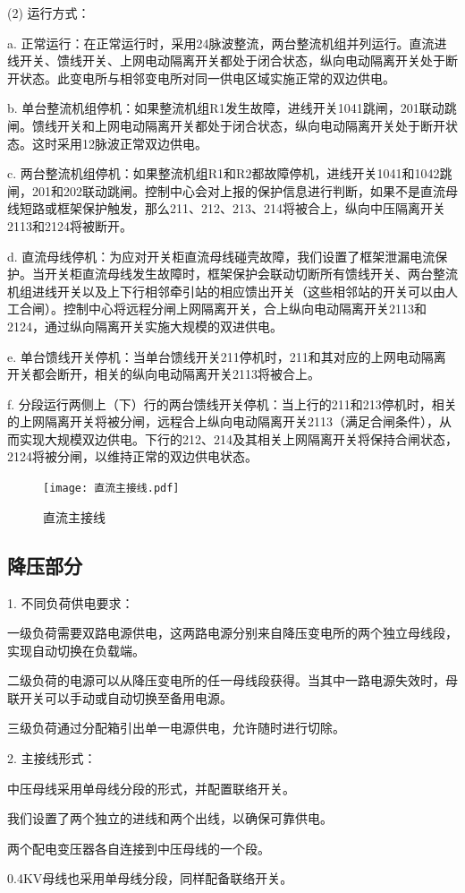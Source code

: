 (2) 运行方式：\par 
a. 正常运行：在正常运行时，采用24脉波整流，两台整流机组并列运行。直流进线开关、馈线开关、上网电动隔离开关都处于闭合状态，纵向电动隔离开关处于断开状态。此变电所与相邻变电所对同一供电区域实施正常的双边供电。\par 
b. 单台整流机组停机：如果整流机组R1发生故障，进线开关1041跳闸，201联动跳闸。馈线开关和上网电动隔离开关都处于闭合状态，纵向电动隔离开关处于断开状态。这时采用12脉波正常双边供电。\par 
c. 两台整流机组停机：如果整流机组R1和R2都故障停机，进线开关1041和1042跳闸，201和202联动跳闸。控制中心会对上报的保护信息进行判断，如果不是直流母线短路或框架保护触发，那么211、212、213、214将被合上，纵向中压隔离开关2113和2124将被断开。\par 
d. 直流母线停机：为应对开关柜直流母线碰壳故障，我们设置了框架泄漏电流保护。当开关柜直流母线发生故障时，框架保护会联动切断所有馈线开关、两台整流机组进线开关以及上下行相邻牵引站的相应馈出开关（这些相邻站的开关可以由人工合闸）。控制中心将远程分闸上网隔离开关，合上纵向电动隔离开关2113和2124，通过纵向隔离开关实施大规模的双进供电。\par 
e. 单台馈线开关停机：当单台馈线开关211停机时，211和其对应的上网电动隔离开关都会断开，相关的纵向电动隔离开关2113将被合上。\par 
f. 分段运行两侧上（下）行的两台馈线开关停机：当上行的211和213停机时，相关的上网隔离开关将被分闸，远程合上纵向电动隔离开关2113（满足合闸条件），从而实现大规模双边供电。下行的212、214及其相关上网隔离开关将保持合闸状态，2124将被分闸，以维持正常的双边供电状态。
\begin{figure}[!h]
	\centering
	\texttt{[image: 直流主接线.pdf]}
	\caption{直流主接线}
	\label{直流主接线}
\end{figure}
\subsection{降压部分}
1. 不同负荷供电要求：\par 

一级负荷需要双路电源供电，这两路电源分别来自降压变电所的两个独立母线段，实现自动切换在负载端。\par 
二级负荷的电源可以从降压变电所的任一母线段获得。当其中一路电源失效时，母联开关可以手动或自动切换至备用电源。\par 
三级负荷通过分配箱引出单一电源供电，允许随时进行切除。\par 

2. 主接线形式：\par 

中压母线采用单母线分段的形式，并配置联络开关。\par 
我们设置了两个独立的进线和两个出线，以确保可靠供电。\par 
两个配电变压器各自连接到中压母线的一个段。\par 
0.4KV母线也采用单母线分段，同样配备联络开关。
\addtocounter{page}{-1}